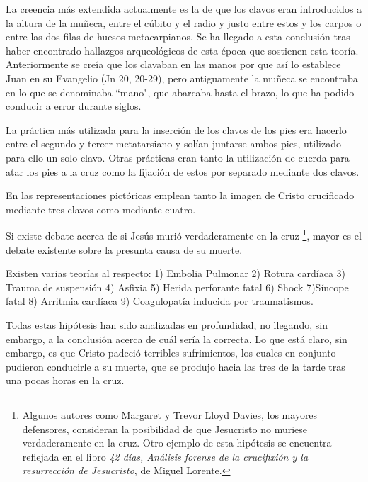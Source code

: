 La creencia más extendida actualmente es la de que los clavos eran introducidos a la altura de la muñeca, entre el cúbito y el radio y justo entre estos y los carpos o entre las dos filas de huesos metacarpianos. Se ha llegado a esta conclusión tras haber encontrado hallazgos arqueológicos de esta época que sostienen esta teoría. Anteriormente se creía que los clavaban en las manos por que así lo establece Juan en su Evangelio (Jn 20, 20-29), pero antiguamente la muñeca se encontraba en lo que se denominaba ``mano", que abarcaba hasta el brazo, lo que ha podido conducir a error durante siglos.

La práctica más utilizada para la inserción de los clavos de los pies era hacerlo entre el segundo y tercer metatarsiano y solían juntarse ambos pies, utilizado para ello un solo clavo. Otras prácticas eran tanto la utilización de cuerda para atar los pies a la cruz como la fijación de estos por separado mediante dos clavos.

En las representaciones pictóricas emplean tanto la imagen de Cristo crucificado mediante tres clavos como mediante cuatro.


Si existe debate acerca de si Jesús murió verdaderamente en la cruz \footnote{Algunos autores como Margaret y Trevor Lloyd Davies, los mayores defensores, consideran la posibilidad de que Jesucristo no muriese verdaderamente en la cruz. Otro ejemplo de esta hipótesis se encuentra reflejada en el libro \textit{42 días, Análisis forense de la crucifixión y la resurrección de Jesucristo}, de Miguel Lorente.}, mayor es el debate existente sobre la presunta causa de su muerte.

Existen varias teorías al respecto: 1) Embolia Pulmonar 2) Rotura cardíaca 3) Trauma de suspensión 4) Asfixia 5) Herida perforante fatal 6) Shock 7)Síncope fatal 8) Arritmia cardíaca 9) Coagulopatía inducida por traumatismos.

Todas estas hipótesis han sido analizadas en profundidad, no llegando, sin embargo, a la conclusión acerca de cuál sería la correcta. Lo que está claro, sin embargo, es que Cristo padeció terribles sufrimientos, los cuales en conjunto pudieron conducirle a su muerte, que se produjo hacia las tres de la tarde tras una pocas horas en la cruz.

